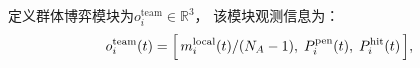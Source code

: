 定义群体博弈模块为$o_i^{\mathrm{team}}\in\mathbb{R}^{3}$，
该模块观测信息为：
\begin{equation}
o_i^{\mathrm{team}}(t)=\Bigl[\,m_i^{\mathrm{local}}(t)/(N_A-1),\;P_i^{\mathrm{pen}}(t),\;P_i^{\mathrm{hit}}(t)\,\Bigr],
\label{eq:obs-team}
\end{equation}







